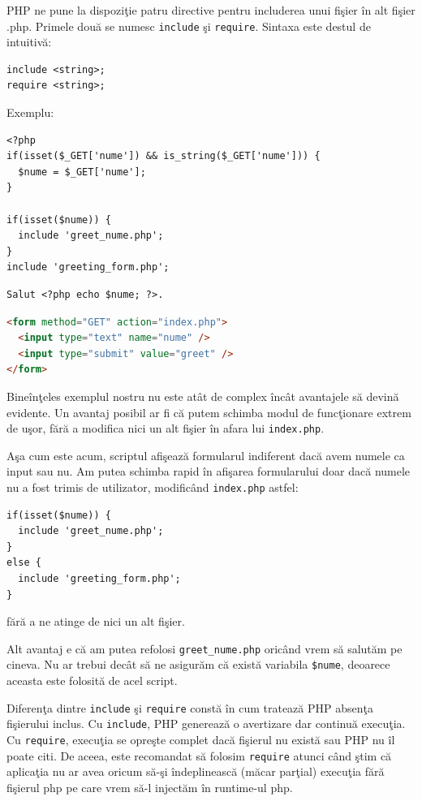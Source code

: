 PHP ne pune la dispoziţie patru directive pentru includerea unui fişier în
alt fişier .php. Primele două se numesc \texttt{include} şi \texttt{require}.
Sintaxa este destul de intuitivă:
\begin{verbatim}
include <string>;
require <string>;
\end{verbatim}

Exemplu:
\begin{lstlisting}[title=index.php]
<?php
if(isset($_GET['nume']) && is_string($_GET['nume'])) {
  $nume = $_GET['nume'];
}

if(isset($nume)) {
  include 'greet_nume.php';
}
include 'greeting_form.php';
\end{lstlisting}
\begin{lstlisting}[title=greet\_nume.php]
Salut <?php echo $nume; ?>.
\end{lstlisting}
\begin{lstlisting}[title=greeting\_form.php,language=html]
<form method="GET" action="index.php">
  <input type="text" name="nume" />
  <input type="submit" value="greet" />
</form>
\end{lstlisting}

Bineînţeles exemplul nostru nu este atât de complex încât 
avantajele să devină evidente. Un avantaj posibil ar fi că putem schimba modul
de funcţionare extrem de uşor, fără a modifica nici un alt
fişier în afara lui \texttt{index.php}.

Aşa cum este acum, scriptul afişează formularul indiferent
dacă avem numele ca input sau nu. Am putea schimba rapid în afişarea
formularului doar dacă numele nu a fost trimis de utilizator, modificând
\texttt{index.php} astfel:
\begin{lstlisting}[title=index.php,firstnumber=6]
if(isset($nume)) {
  include 'greet_nume.php';
}
else {
  include 'greeting_form.php';
}
\end{lstlisting}
fără a ne atinge de nici un alt fişier.

Alt avantaj e că am putea refolosi \texttt{greet\_nume.php} oricând
vrem să salutăm pe cineva. Nu ar trebui decât să ne asigurăm că există variabila
\texttt{\$nume}, deoarece aceasta este folosită de acel script.

Diferenţa dintre \texttt{include} şi \texttt{require} constă în cum
tratează PHP absenţa fişierului inclus. Cu \texttt{include}, PHP generează
o avertizare dar continuă execuţia. Cu \texttt{require}, execuţia se opreşte
complet dacă fişierul nu există sau PHP nu îl poate citi. De aceea,
este recomandat să folosim \texttt{require} atunci când ştim că aplicaţia
nu ar avea oricum să-şi îndeplinească (măcar parţial) execuţia fără
fişierul php pe care vrem să-l injectăm în runtime-ul php.

